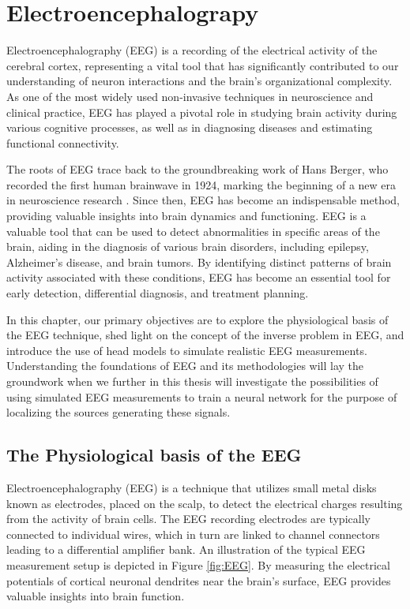 \documentclass[a4paper, UKenglish, 11pt]{uiomaster}
\begin{document}
\chapter{Electroencephalograpy}
Electroencephalography (EEG) is a recording of the electrical activity of the cerebral cortex, representing a vital tool that has significantly contributed to our understanding of neuron interactions and the brain's organizational complexity. As one of the most widely used non-invasive techniques in neuroscience and clinical practice, EEG has played a pivotal role in studying brain activity during various cognitive processes, as well as in diagnosing diseases and estimating functional connectivity.

The roots of EEG trace back to the groundbreaking work of Hans Berger, who recorded the first human brainwave in 1924, marking the beginning of a new era in neuroscience research \cite{wiki:electroencephalography}. Since then, EEG has become an indispensable method, providing valuable insights into brain dynamics and functioning. EEG is a valuable tool that can be used to detect abnormalities in specific areas of the brain, aiding in the diagnosis of various brain disorders, including epilepsy, Alzheimer's disease, and brain tumors. By identifying distinct patterns of brain activity associated with these conditions, EEG has become an essential tool for early detection, differential diagnosis, and treatment planning.

In this chapter, our primary objectives are to explore the physiological basis of the EEG technique, shed light on the concept of the inverse problem in EEG, and introduce the use of head models to simulate realistic EEG measurements. Understanding the foundations of EEG and its methodologies will lay the groundwork when we further in this thesis will investigate the possibilities of using simulated EEG measurements to train a neural network for the purpose of localizing the sources generating these signals.

\section{The Physiological basis of the EEG}

Electroencephalography (EEG) is a technique that utilizes small metal disks known as electrodes, placed on the scalp, to detect the electrical charges resulting from the activity of brain cells. The EEG recording electrodes are typically connected to individual wires, which in turn are linked to channel connectors leading to a differential amplifier bank. An illustration of the typical EEG measurement setup is depicted in Figure \ref{fig:EEG}. By measuring the electrical potentials of cortical neuronal dendrites near the brain's surface, EEG provides valuable insights into brain function.
\end{document}
